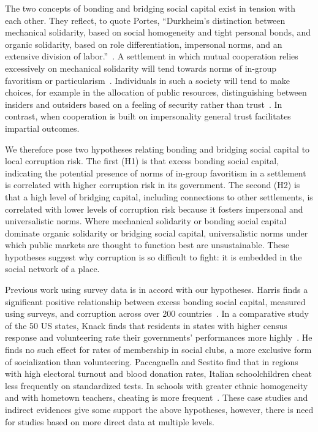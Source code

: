 The two concepts of bonding and bridging social capital exist in tension with each other. They reflect, to quote Portes, ``Durkheim's distinction between mechanical solidarity, based on social homogeneity and tight personal bonds, and organic solidarity, based on role differentiation, impersonal norms, and an extensive division of labor.''~\cite{portes2014downsides}. A settlement in which mutual cooperation relies excessively on mechanical solidarity will tend towards norms of in-group favoritism or particularism~\cite{mungiu2013controlling}. Individuals in such a society will tend to make choices, for example in the allocation of public resources, distinguishing between insiders and outsiders based on a feeling of security rather than trust~\cite{yamagishi2011trust}. In contrast, when cooperation is built on impersonality general trust facilitates impartial outcomes.

We therefore pose two hypotheses relating bonding and bridging social capital to local corruption risk. The first (H1) is that excess bonding social capital, indicating the potential presence of norms of in-group favoritism in a settlement is correlated with higher corruption risk in its government. The second (H2) is that a high level of bridging capital, including connections to other settlements, is correlated with lower levels of corruption risk because it fosters impersonal and universalistic norms. Where mechanical solidarity or bonding social capital dominate organic solidarity or bridging social capital, universalistic norms under which public markets are thought to function best are unsustainable. These hypotheses suggest why corruption is so difficult to fight: it is embedded in the social network of a place.

Previous work using survey data is in accord with our hypotheses. Harris finds a significant positive relationship between excess bonding social capital, measured using surveys, and corruption across over 200 countries~\cite{harris2007}. In a comparative study of the 50 US states, Knack finds that residents in states with higher census response and volunteering rate their governments' performances more highly~\cite{knack2002social}. He finds no such effect for rates of membership in social clubs, a more exclusive form of socialization than volunteering. Paccagnella and Sestito find that in regions with high electoral turnout and blood donation rates, Italian schoolchildren cheat less frequently on standardized tests. In schools with greater ethnic homogeneity and with hometown teachers, cheating is more frequent~\cite{paccagnella2014school}. These case studies and indirect evidences give some support the above hypotheses, however, there is need for studies based on more direct data at multiple levels. 

